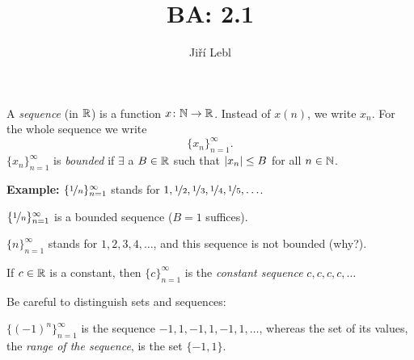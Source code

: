\documentclass[10pt,aspectratio=169]{beamer}
\author{Ji\v{r}\'i Lebl}
\institute[OSU]{%
Departemento pri Matematiko de Oklahoma {\^S}tata Universitato}
\title{BA: 2.1}
\date{}
\begin{document}
\begin{frame}
\titlepage
\end{frame}

\begin{frame}
\begin{definition}
A \emph{sequence} (in ${\mathbb{R}}$) is a function $x \colon {\mathbb{N}} \to
{\mathbb{R}}$.  Instead of $x(n)$, we write $x_n$.  For the whole sequence
we write
\begin{equation*}
\{ x_n \}_{n=1}^\infty .
\end{equation*}
\pause
$\{ x_n \}_{n=1}^\infty$ is \emph{bounded} if
$\exists$ a $B \in {\mathbb{R}}$ such that
\quad
$\left\lvert {x_n} \right\rvert \leq B$ \quad for all $n \in {\mathbb{N}}$.
\end{definition}

\pause

\textbf{Example:}
$\{ \nicefrac{1}{n} \}_{n=1}^\infty$ stands for
$1, \nicefrac{1}{2}, \nicefrac{1}{3}, \nicefrac{1}{4}, \nicefrac{1}{5}, \ldots$.

\pause
$\{ \nicefrac{1}{n} \}_{n=1}^\infty$
is a bounded sequence ($B=1$ suffices).

\medskip
\pause

$\{ n \}_{n=1}^\infty$ stands for
$1,2,3,4,\ldots$, and this sequence is not bounded (why?).

\medskip
\pause

If $c \in {\mathbb{R}}$ is a constant, then $\{ c \}_{n=1}^\infty$
is the \emph{constant sequence}
$c,c,c,c,\ldots$

\medskip
\pause

Be careful to distinguish sets and sequences:

$\{ {(-1)}^n \}_{n=1}^\infty$ is the sequence
$-1,1,-1,1,-1,1,\ldots$, whereas the set of its values, the
\emph{range of the sequence},
is the set $\{ -1, 1 \}$.

\end{frame}
\end{document}
